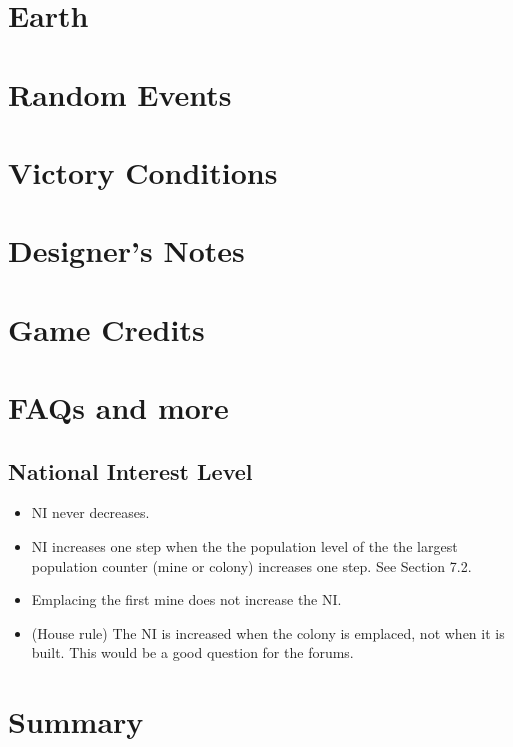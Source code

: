 \documentclass[10pt]{article}
\begin{document}
\begin{multicols}{2}
\section{Earth}

\section{Random Events}

\section{Victory Conditions}

\section{Designer's Notes}

\section{Game Credits}


\section{FAQs and more}

\subsection{National Interest Level}

\begin{itemize}
  \item NI never decreases.
  \item NI increases one step when the the population level of the the largest
    population counter (mine or colony) increases one step. See Section 7.2.
  \item Emplacing the first mine does not increase the NI.
  \item (House rule) The NI is increased when the colony is emplaced, not when
    it is built. This would be a good question for the forums.
\end{itemize}
\section{Summary}

\end{multicols}

\appendix
\end{document}

